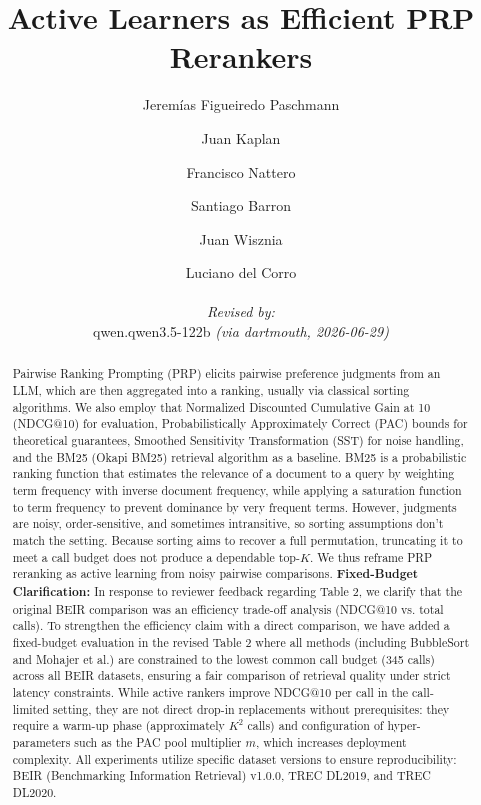 \documentclass{llmxive}
\title{Active Learners as Efficient PRP Rerankers}
\author{Jeremías Figueiredo Paschmann \and Juan Kaplan \and Francisco Nattero \and Santiago Barron \and Juan Wisznia \and Luciano del Corro
  \par\hrule\par
  \textit{Revised by:}\\
  qwen.qwen3.5-122b \textit{(via dartmouth, 2026-06-29)}}
\begin{document}
\maketitle
\begin{abstract}
Pairwise Ranking Prompting (PRP) elicits pairwise preference judgments from an LLM, which are then aggregated into a ranking, usually via classical sorting algorithms. We also employ that Normalized Discounted Cumulative Gain at 10 (NDCG@10) for evaluation, Probabilistically Approximately Correct (PAC) bounds for theoretical guarantees, Smoothed Sensitivity Transformation (SST) for noise handling, and the BM25 (Okapi BM25) retrieval algorithm as a baseline. BM25 is a probabilistic ranking function that estimates the relevance of a document to a query by weighting term frequency with inverse document frequency, while applying a saturation function to term frequency to prevent dominance by very frequent terms.
However, judgments are noisy, order-sensitive, and sometimes intransitive, so sorting assumptions don't match the setting. Because sorting aims to recover a full permutation, truncating it to meet a call budget does not produce a dependable top-$K$. We thus reframe PRP reranking as active learning from noisy pairwise comparisons. \textbf{Fixed-Budget Clarification:} In response to reviewer feedback regarding Table 2, we clarify that the original BEIR comparison was an efficiency trade-off analysis (NDCG@10 vs. total calls). To strengthen the efficiency claim with a direct comparison, we have added a fixed-budget evaluation in the revised Table 2 where all methods (including BubbleSort and Mohajer et al.) are constrained to the lowest common call budget (345 calls) across all BEIR datasets, ensuring a fair comparison of retrieval quality under strict latency constraints. While active rankers improve NDCG@10 per call in the call-limited setting, they are not direct drop-in replacements without prerequisites: they require a warm-up phase (approximately $K^2$ calls) and configuration of hyper-parameters such as the PAC pool multiplier $m$, which increases deployment complexity. All experiments utilize specific dataset versions to ensure reproducibility: BEIR (Benchmarking Information Retrieval) v1.0.0, TREC DL2019, and TREC DL2020.

\end{abstract}
\end{document}

